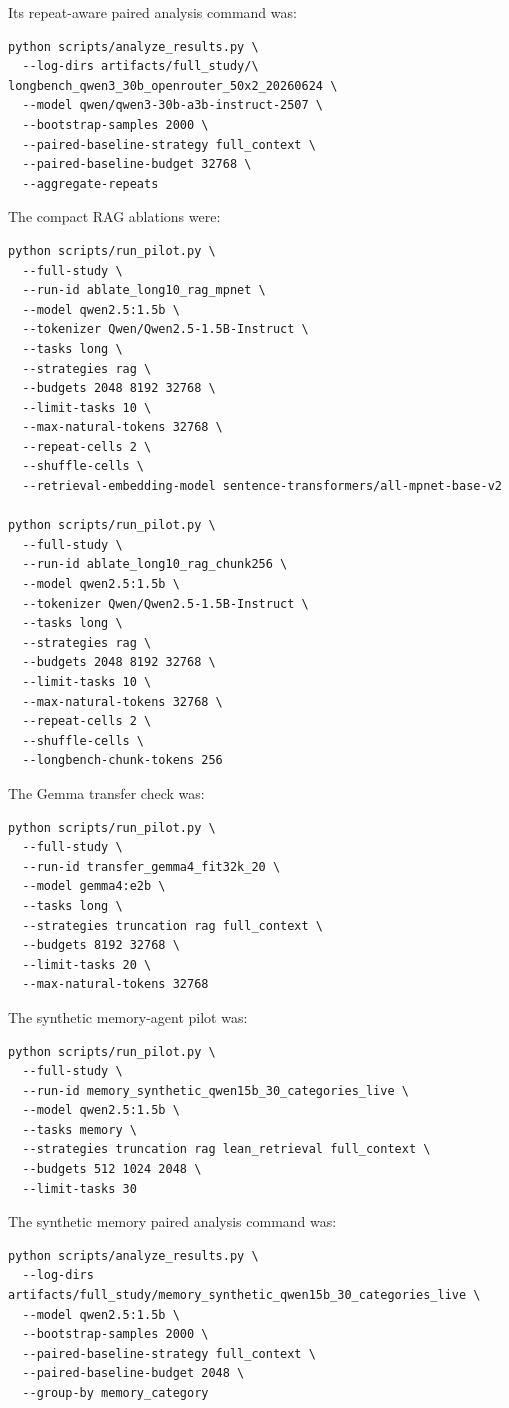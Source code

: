 \documentclass[11pt]{article}
\begin{document}
Its repeat-aware paired analysis command was:
\begin{verbatim}
python scripts/analyze_results.py \
  --log-dirs artifacts/full_study/\
longbench_qwen3_30b_openrouter_50x2_20260624 \
  --model qwen/qwen3-30b-a3b-instruct-2507 \
  --bootstrap-samples 2000 \
  --paired-baseline-strategy full_context \
  --paired-baseline-budget 32768 \
  --aggregate-repeats
\end{verbatim}

The compact RAG ablations were:
\begin{verbatim}
python scripts/run_pilot.py \
  --full-study \
  --run-id ablate_long10_rag_mpnet \
  --model qwen2.5:1.5b \
  --tokenizer Qwen/Qwen2.5-1.5B-Instruct \
  --tasks long \
  --strategies rag \
  --budgets 2048 8192 32768 \
  --limit-tasks 10 \
  --max-natural-tokens 32768 \
  --repeat-cells 2 \
  --shuffle-cells \
  --retrieval-embedding-model sentence-transformers/all-mpnet-base-v2

python scripts/run_pilot.py \
  --full-study \
  --run-id ablate_long10_rag_chunk256 \
  --model qwen2.5:1.5b \
  --tokenizer Qwen/Qwen2.5-1.5B-Instruct \
  --tasks long \
  --strategies rag \
  --budgets 2048 8192 32768 \
  --limit-tasks 10 \
  --max-natural-tokens 32768 \
  --repeat-cells 2 \
  --shuffle-cells \
  --longbench-chunk-tokens 256
\end{verbatim}

The Gemma transfer check was:
\begin{verbatim}
python scripts/run_pilot.py \
  --full-study \
  --run-id transfer_gemma4_fit32k_20 \
  --model gemma4:e2b \
  --tasks long \
  --strategies truncation rag full_context \
  --budgets 8192 32768 \
  --limit-tasks 20 \
  --max-natural-tokens 32768
\end{verbatim}

The synthetic memory-agent pilot was:
\begin{verbatim}
python scripts/run_pilot.py \
  --full-study \
  --run-id memory_synthetic_qwen15b_30_categories_live \
  --model qwen2.5:1.5b \
  --tasks memory \
  --strategies truncation rag lean_retrieval full_context \
  --budgets 512 1024 2048 \
  --limit-tasks 30
\end{verbatim}

The synthetic memory paired analysis command was:
\begin{verbatim}
python scripts/analyze_results.py \
  --log-dirs artifacts/full_study/memory_synthetic_qwen15b_30_categories_live \
  --model qwen2.5:1.5b \
  --bootstrap-samples 2000 \
  --paired-baseline-strategy full_context \
  --paired-baseline-budget 2048 \
  --group-by memory_category
\end{verbatim}
\end{document}

